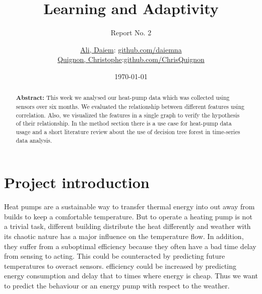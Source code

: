 \documentclass{scrartcl}
\begin{document}
\title{Learning and Adaptivity}
\subtitle{Report No. 2}
\author{
  \href{daiem.ali@smail.inf.h-brs.de}{Ali, Daiem}: \href{https://github.com/daiemna}{github.com/daiemna}\\
  \href{christophe.quignon@smail.inf.h-brs.de}{Quignon, Christophe}:\href{https://github.com/ChrisQuignon}{github.com/ChrisQuignon}
}
\date{\today}


\maketitle



\begin{abstract}
\textbf{Abstract:} This week we analysed our heat-pump data which was collected using sensors over six months. We evaluated the relationship between different features using correlation. Also, we visualized the features in a single graph to verify the hypothesis of their relationship. In the method section there is a use case for heat-pump data usage and a short literature review about the use of decision tree forest in time-series data analysis.
\end{abstract}


\section{Project introduction}

Heat pumps are a sustainable way to transfer thermal energy into out away from builds to keep a comfortable temperature. But to operate a heating pump is not a trivial task, different building distribute the heat differently and weather with its chaotic nature has a major influence on the temperature flow. In addition, they suffer from a suboptimal efficiency because they often have a bad time delay from sensing to acting. This could be counteracted by predicting future temperatures to overact sensors. efficiency could be increased by predicting energy consumption and delay that to times where energy is cheap. 
Thus we want to predict the behaviour or an energy pump with respect to the weather.
\end{document}
